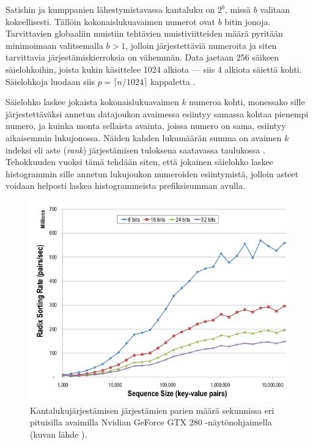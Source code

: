 \documentclass[a4paper,11pt]{article}
\newcommand{\engl}[1]{\foreignlanguage{english}{\em #1}}
\begin{document}
Satishin ja kumppanien \cite{satish2009} lähestymistavassa kantaluku on $2^b$, missä $b$ valitaan kokeellisesti. Tällöin kokonaislukuavaimen numerot ovat $b$ bitin jonoja. Tarvittavien globaaliin muistiin tehtävien muistiviitteiden määrä pyritään minimoimaan valitsemalla $b > 1$, jolloin järjestettäviä numeroita ja siten tarvittavia järjestämiskierroksia on vähemmän. Data jaetaan 256 säikeen säielohkoihin, joista kukin käsittelee 1024 alkiota --- siis 4 alkiota säiettä kohti. Säielohkoja luodaan siis $p = \lceil n/1024 \rceil$ kappaletta \cite{satish2009}.

Säielohko laskee jokaista kokonaislukuavaimen $k$ numeroa kohti, monessako sille järjestettäväksi annetun datajoukon avaimessa esiintyy samassa kohtaa pienempi numero, ja kuinka monta sellaista avainta, joissa numero on sama, esiintyy aikaisemmin lukujonossa. Näiden kahden lukumäärän summa on avaimen $k$ indeksi eli aste (\engl{rank}) järjestämisen tuloksena saatavassa taulukossa \cite{satish2009}. Tehokkuuden vuoksi tämä tehdään siten, että jokainen säielohko laskee histogrammin sille annetun lukujoukon numeroiden esiintymistä, jolloin asteet voidaan helposti laskea histogrammeista prefiksisumman avulla.

\begin{figure}
\centering
\includegraphics[scale = 0.45]{radix_sort_varying_key_size}
\caption{Kantalukujärjestämisen järjestämien parien määrä sekunnissa eri pituisilla avaimilla Nvidian GeForce GTX 280 -näytönohjaimella (kuvan lähde \cite{satish2009}).}
\label{fig:radix_sort_varying_key_size}
\end{figure}
\end{document}
